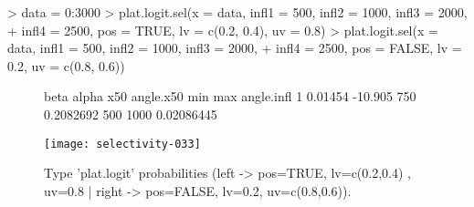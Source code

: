 \documentclass[letterpaper, 12pt]{article}
\begin{document}
\begin{Schunk}
\begin{Sinput}
> data = 0:3000
> plat.logit.sel(x = data, infl1 = 500, infl2 = 1000, infl3 = 2000, 
+     infl4 = 2500, pos = TRUE, lv = c(0.2, 0.4), uv = 0.8)
> plat.logit.sel(x = data, infl1 = 500, infl2 = 1000, infl3 = 2000, 
+     infl4 = 2500, pos = FALSE, lv = 0.2, uv = c(0.8, 0.6))
\end{Sinput}
\end{Schunk}
\begin{figure}[h]
\vspace{-20pt}
\begin{center}
\begin{Schunk}
\begin{Soutput}
     beta   alpha x50 angle.x50 min  max angle.infl
1 0.01454 -10.905 750 0.2082692 500 1000 0.02086445
\end{Soutput}
\end{Schunk}
\texttt{[image: selectivity-033]}
\end{center}
\vspace{-30pt}
\caption{Type 'plat.logit' probabilities (left -> pos=TRUE, lv=c(0.2,0.4) , uv=0.8 | right -> pos=FALSE, lv=0.2, uv=c(0.8,0.6)).}
\vspace{-10pt}
\label{fig16}
\end{figure}







        
        
\end{document}
